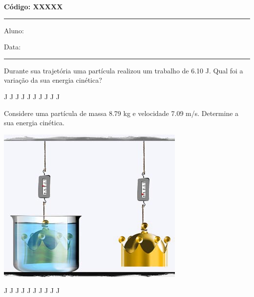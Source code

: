 \documentclass[12pt, addpoints]{exam}
\begin{document}
\begin{minipage}[r]{0.45\linewidth}
    \begin{flushright}
        {\bf \Large Código: XXXXX}
    \end{flushright}
\end{minipage}
\vspace{0.5cm} \hrule \vspace{0.5cm}
\begin{minipage}{0.75\linewidth}
    Aluno:
\end{minipage}
\begin{minipage}{0.20\linewidth}
    Data: 
\end{minipage}
\vspace{0.5cm} \hrule \vspace{0.5cm}

\begin{questions}
\begin{multicols}{2}
\question[33] 
            Durante sua trajetória uma partícula realizou um trabalho de    6.10 J. Qual foi a variação da sua energia cinética?
        
\begin{oneparchoices}
 J J J J J J J J J J\end{oneparchoices}
\question[23] 
            Considere uma partícula de massa    8.79 kg e velocidade    7.09 m/s. Determine a sua energia cinética.
        
\begin{center}
\begin{minipage}[c]{0.75\linewidth}
\includegraphics[width=\textwidth]{MWE001.jpg}
\end{minipage}
\end{center}
\begin{oneparchoices}
 J J J J J J J J J J\end{oneparchoices}
\end{multicols}
\end{questions}
\newpage
\end{document}
